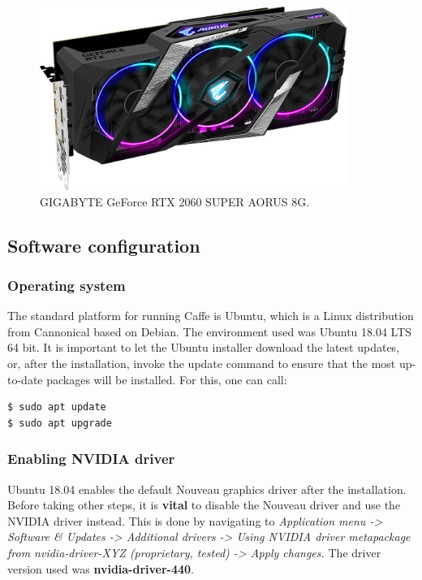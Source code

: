 \vspace{5mm}
\begin{figure}[h]
	\begin{center}
		\includegraphics*[width=10cm, keepaspectratio]{obr/grafika.jpeg}
	\end{center}
	\vspace{4mm}
	\caption{GIGABYTE GeForce RTX 2060 SUPER AORUS 8G. \cite{gigabyte}} 
	\label{grafika}
\end{figure}  


\newpage
\subsection{Software configuration} 

\subsubsection{Operating system} 

The standard platform for running Caffe is Ubuntu, which is a Linux distribution from Cannonical based on Debian. The environment used was Ubuntu 18.04 LTS 64 bit. It is important to let the Ubuntu installer download the latest updates, or, after the installation, invoke the update command to ensure that the most up-to-date packages will be installed. For this, one can call:

\begin{lstlisting}[language=bash]
$ sudo apt update
$ sudo apt upgrade
\end{lstlisting}

\subsubsection{Enabling NVIDIA driver}

Ubuntu 18.04 enables the default Nouveau graphics driver after the installation. Before taking other steps, it is \textbf{vital} to disable the Nouveau driver and use the NVIDIA driver instead. This is done by navigating to \textit{Application menu -> Software \& Updates -> Additional drivers
	-> Using NVIDIA driver metapackage from nvidia-driver-XYZ (proprietary, tested) -> Apply changes.} The driver version used was \textbf{nvidia-driver-440}.

